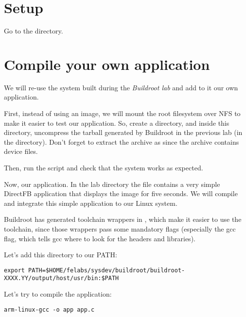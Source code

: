 
\section{Setup}

Go to the  directory.

\section{Compile your own application}

We will re-use the system built during the {\em Buildroot lab} and add
to it our own application.

First, instead of using an  image, we will mount the root
filesystem over NFS to make it easier to test our application. So,
create a  directory, and inside this directory,
uncompress the tarball generated by Buildroot in the previous lab (in
the  directory). Don't forget to extract the
archive as  since the archive contains device files.

Then, run the  script and check that the system works
as expected.

Now, our application. In the lab directory the file 
contains a very simple DirectFB application that displays the
 image for five seconds. We will compile and
integrate this simple application to our Linux system.

Buildroot has generated toolchain wrappers in
, which make it easier to use the toolchain,
since those wrappers pass some mandatory flags (especially the
 gcc flag, which tells gcc where to look for the
headers and libraries).

Let's add this directory to our PATH:

\footnotesize
\begin{verbatim}
export PATH=$HOME/felabs/sysdev/buildroot/buildroot-XXXX.YY/output/host/usr/bin:$PATH
\end{verbatim}
\normalsize

Let's try to compile the application:

\begin{verbatim}
arm-linux-gcc -o app app.c
\end{verbatim}

